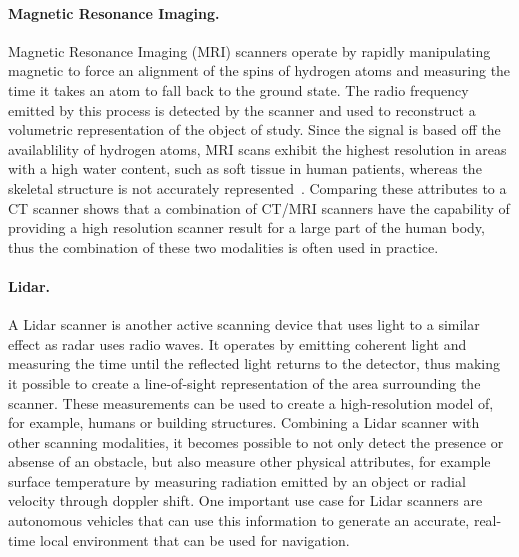 \paragraph{Magnetic Resonance Imaging. }  Magnetic Resonance Imaging (MRI) scanners operate by rapidly manipulating magnetic to force an alignment of the spins of hydrogen atoms and measuring the time it takes an atom to fall back to the ground state.  The radio frequency emitted by this process is detected by the scanner and used to reconstruct a  volumetric representation of the object of study.  Since the signal is based off the availablility of hydrogen atoms, MRI scans exhibit the highest resolution in areas with a high water content, such as soft tissue in human patients, whereas the skeletal structure is not accurately represented~\cite{damadian1971tumor}.  Comparing these attributes to a CT scanner shows that a combination of CT/MRI scanners have the capability of providing a high resolution scanner result for a large part of the human body, thus the combination of these two modalities is often used in practice.

\paragraph{Lidar. }  A Lidar scanner is another active scanning device that uses light to a similar effect as radar uses radio waves.  It operates by emitting coherent light and measuring the time until the reflected light returns to the detector, thus making it possible to create a  line-of-sight representation of the area surrounding the scanner.  These measurements can be used to create a high-resolution  model of, for example, humans or building structures.  Combining a Lidar scanner with other scanning modalities, it becomes possible to not only detect the presence or absense of an obstacle, but also measure other physical attributes, for example surface temperature by measuring radiation emitted by an object or radial velocity through doppler shift.  One important use case for Lidar scanners are autonomous vehicles that can use this information to generate an accurate, real-time  local environment that can be used for navigation.

